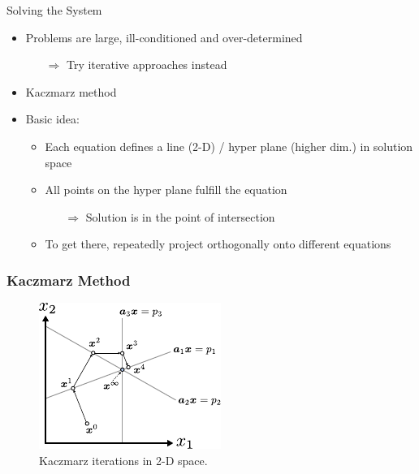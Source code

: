 \begin{frame}[c]{Solving the System}


	\begin{itemize}
		\setlength\itemsep{0.3cm}
		\item Problems are large, ill-conditioned and over-determined
		      \begin{itemize}
			      \item[$\Rightarrow$] Try iterative approaches instead
		      \end{itemize}
	\end{itemize}
	\vspace{1cm}

	\begin{itemize}
		\item Kaczmarz method
		\item Basic idea:
		      \begin{itemize}
			      \item Each equation defines a line (2-D) / hyper plane (higher dim.) in solution space
			      \item All points on the hyper plane fulfill the equation
			            \begin{itemize}
				            \item[$\Rightarrow$] Solution is in the point of intersection
			            \end{itemize}
			      \item To get there, repeatedly project orthogonally onto different equations
		      \end{itemize}

	\end{itemize}

\end{frame}

\begin{frame}
	\frametitle{Kaczmarz Method}

	\begin{figure}[tbp]
		\centering
		\includegraphics[height=0.8\textheight]{images/algebraic_2}
		\caption{Kaczmarz iterations in 2-D space.}
		\label{fig:ct_algebraic_2}
	\end{figure}

\end{frame}

